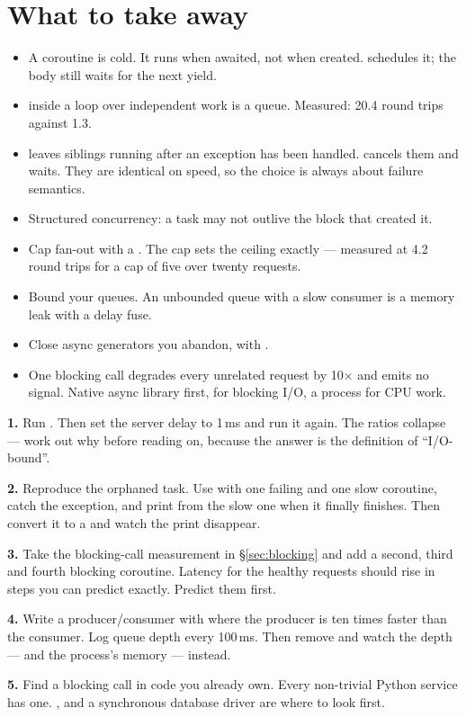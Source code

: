 \section{What to take away}
\label{sec:ch3-summary}

\begin{itemize}[leftmargin=1.4em]
\item A coroutine is cold. It runs when awaited, not when created.
       schedules it; the body still waits for the next yield.
\item {} inside a loop over independent work is a queue. Measured:
      20.4 round trips against 1.3.
\item {} leaves siblings running after an exception has been handled.
       cancels them and waits. They are identical on speed, so
      the choice is always about failure semantics.
\item Structured concurrency: a task may not outlive the block that created it.
\item Cap fan-out with a . The cap sets the ceiling exactly ---
      measured at 4.2 round trips for a cap of five over twenty requests.
\item Bound your queues. An unbounded queue with a slow consumer is a memory leak
      with a delay fuse.
\item Close async generators you abandon, with .
\item One blocking call degrades every unrelated request by 10$\times$ and emits
      no signal. Native async library first,  for blocking I/O,
      a process for CPU work.
\end{itemize}

\begin{exercisebox}
\textbf{1.} Run . Then set the server delay
to 1\,ms and run it again. The ratios collapse --- work out why before reading
on, because the answer is the definition of ``I/O-bound''.

\textbf{2.} Reproduce the orphaned task. Use  with one failing and
one slow coroutine, catch the exception, and print from the slow one when it
finally finishes. Then convert it to a  and watch the print
disappear.

\textbf{3.} Take the blocking-call measurement in \S\ref{sec:blocking} and add a
second, third and fourth blocking coroutine. Latency for the healthy requests
should rise in steps you can predict exactly. Predict them first.

\textbf{4.} Write a producer/consumer with  where the
producer is ten times faster than the consumer. Log queue depth every 100\,ms.
Then remove  and watch the depth --- and the process's memory ---
instead.

\textbf{5.} Find a blocking call in code you already own. Every non-trivial
Python service has one. ,  and a synchronous
database driver are where to look first.
\end{exercisebox}

